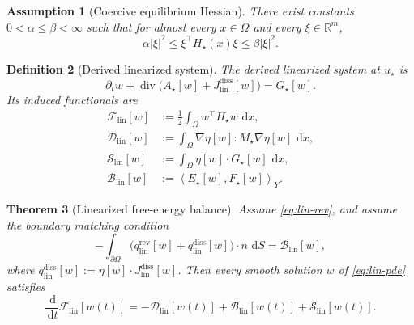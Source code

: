 \documentclass[11pt]{article}
\newtheorem{theorem}{Theorem}[section]
\newtheorem{definition}[theorem]{Definition}
\newtheorem{assumption}[theorem]{Assumption}
\newcommand{\R}{\mathbb{R}}
\newcommand{\Om}{\Omega}
\newcommand{\pa}{\partial}
\newcommand{\grad}{\nabla}
\newcommand{\diver}{\operatorname{div}}
\newcommand{\dd}{\,\mathrm{d}}
\newcommand{\F}{\mathcal{F}}
\newcommand{\Diss}{\mathcal{D}}
\newcommand{\Bnd}{\mathcal{B}}
\newcommand{\Src}{\mathcal{S}}
\newcommand{\lin}{\mathrm{lin}}
\newcommand{\pair}[2]{\left\langle #1,#2\right\rangle}
\begin{document}
\begin{assumption}[Coercive equilibrium Hessian]\label{ass:hessian-coercive}
There exist constants \(0<\alpha\le \beta<\infty\) such that for almost every
\(x\in\Om\) and every \(\xi\in\R^m\),
\[
\alpha |\xi|^2 \le \xi^\top H_\star(x)\xi \le \beta |\xi|^2.
\]
\end{assumption}

\begin{definition}[Derived linearized system]
The derived linearized system at \(u_\star\) is
\begin{equation}\label{eq:lin-pde}
\partial_t w + \diver\bigl(A_\star[w]+J_{\lin}^{\mathrm{diss}}[w]\bigr)
=
G_\star[w].
\end{equation}
Its induced functionals are
\begin{align}
\F_{\lin}[w]
&:=
\frac12\int_\Om w^\top H_\star w\,\dd x,\label{eq:F-lin}\\
\Diss_{\lin}[w]
&:=
\int_\Om \grad \eta[w]:M_\star\grad \eta[w]\,\dd x,\label{eq:D-lin}\\
\Src_{\lin}[w]
&:=
\int_\Om \eta[w]\cdot G_\star[w]\,\dd x,\label{eq:S-lin}\\
\Bnd_{\lin}[w]
&:=
\pair{E_\star[w]}{F_\star[w]}_Y.\label{eq:B-lin}
\end{align}
\end{definition}

\begin{theorem}[Linearized free-energy balance]\label{thm:lin-balance}
Assume \eqref{eq:lin-rev}, and assume the boundary matching condition
\begin{equation}\label{eq:lin-boundary}
-\int_{\pa\Om}\bigl(q_{\lin}^{\mathrm{rev}}[w]+q_{\lin}^{\mathrm{diss}}[w]\bigr)\cdot n\,\dd S
=
\Bnd_{\lin}[w],
\end{equation}
where \(q_{\lin}^{\mathrm{diss}}[w]:=\eta[w]\cdot J_{\lin}^{\mathrm{diss}}[w]\).
Then every smooth solution \(w\) of \eqref{eq:lin-pde} satisfies
\begin{equation}\label{eq:lin-balance}
\frac{\dd}{\dd t}\F_{\lin}[w(t)]
=
-\Diss_{\lin}[w(t)] + \Bnd_{\lin}[w(t)] + \Src_{\lin}[w(t)].
\end{equation}
\end{theorem}
\end{document}
